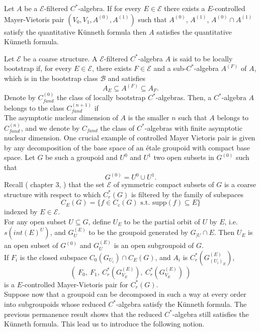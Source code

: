 \begin{thm}
Let $A$ be a $\mathcal E$-filtered $C^*$-algebra. If for every $E\in \mathcal E$ there exists a $E$-controlled Mayer-Vietoris pair $(V_0, V_1, A^{(0)}, A^{(1)})$ such that $A^{(0)}$, $A^{(1)}$, $A^{(0)} \cap A^{(1)}$ satisfy the quantitative Künneth formula then $A$ satisfies the quantitative Künneth formula.   
\end{thm}

Let $\mathcal E$ be a coarse structure. A $\mathcal E$-filtered $C^*$-algebra $A$ is said to be locally bootstrap if, for every $E\in \mathcal E$, there exists $F\in \mathcal E$ and a sub-$C^*$-algebra $A^{(F)}$ of $A$, which is in the bootstrap class $\mathcal B$ and satisfies
\[A_E \subseteq A^{(F)}\subseteq A_F. \]
Denote by $C_{fand}^{(0)}$ the class of locally bootstrap $C^*$-algebras. Then, a $C^*$-algebra $A$ belongs to the class $C^{(n+1)}_{fand}$ if \\

The asymptotic nuclear dimension of $A$ is the smaller $n$ such that $A$ belongs to $C^{(n)}_{fand}$, and we denote by $C_{fand}$ the class of $C^*$-algebras with finite asymptotic nuclear dimension.
One crucial example of controlled Mayer Vietoris pair is given by any decomposition of the base space of an \'etale groupoid with compact base space. Let $G$ be such a groupoid and $U^0$ and $U^1$ two open subsets in $G^{(0)}$ such that
\[G^{(0)} = U^0 \cup U^1. \]
Recall (\cite{DellaieraThesis} chapter $3$, \cite{dell2017controlled}) that the set $\mathcal E$ of symmetric compact subsets of $G$ is a coarse structure with respect to which $C_r^*(G)$ is filtered by the family of subspaces 
\[C_E(G) = \{ f\in C_c(G) \text{ s.t. supp}(f)\subseteq E  \}\]
indexed by $E\in \mathcal E$.\\

For any open subset $U\subseteq G$, define $U_E$ to be the partial orbit of $U$ by $E$, i.e. $s(int(E)^U)$, and $G^{(E)}_U$ to be the groupoid generated by $G_{|U}\cap E$. Then $U_E$ is an open subset of $G^{(0)}$ and $G^{(E)}_U$ is an open subgroupoid of $G$.\\
 
If $F_i$ is the closed subspace $C_0(G_{U_i})\cap C_E(G)$, and $A_i$ is $C_r^*(G_{(U_i)_E}^{(E)})$, 
\[\left( \ F_0 , \ F_1 , \ C_r^*(G_{V_E}^{(E)}) , \ C_r^*(G_{V_E}^{(E)}) \  \right)\]
is a $E$-controlled Mayer-Vietoris pair for $C_r^*(G)$. \\
Suppose now that a groupoid can be decomposed in such a way at every order into subgroupoids whose reduced $C^*$-algebra satisfy the Künneth formula. The previous permanence result shows that the reduced $C^*$-algebra still satisfies the Künneth formula. This lead us to introduce the following notion.


